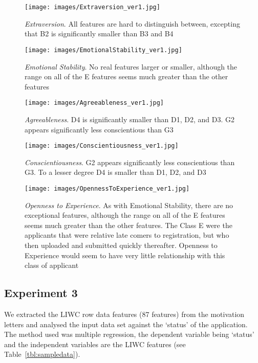 \documentclass[letterpaper]{article}
\begin{document}
\begin{figure*}[!hp]
\centering
\texttt{[image: images/Extraversion\_ver1.jpg]}
\caption{{\emph{Extraversion}}. All features are hard to distinguish between, excepting that B2 is
significantly smaller than B3 and B4}
\label{fig:extraversion}
\end{figure*}

\begin{figure*}[!hp]
\centering
\texttt{[image: images/EmotionalStability\_ver1.jpg]}
\caption{{\emph{Emotional Stability}}. No real features larger or smaller, although the range on all of the E
features seems much greater than the other features}
\label{fig:emotstab}
\end{figure*}

\begin{figure*}[!hp]
\centering
\texttt{[image: images/Agreeableness\_ver1.jpg]}
\caption{{\emph{Agreeableness}}. D4 is significantly smaller than D1, D2, and D3. G2 appears
significantly less conscientious than G3}
\label{fig:agreeableness}
\end{figure*}

\begin{figure*}[!hp]
\centering
\texttt{[image: images/Conscientiousness\_ver1.jpg]}
\caption{{\emph{Conscientiousness}}. G2 appears significantly less conscientious than G3. To a lesser
degree D4 is smaller than D1, D2, and D3}
\label{fig:conscientiousness}
\end{figure*}

\begin{figure*}[!hp]
\centering
\texttt{[image: images/OpennessToExperience\_ver1.jpg]}
\caption{{\emph{Openness to Experience}}. As with Emotional Stability, there are no exceptional features,
although the range on all of the E features seems much greater than
the other features. The Class E were the applicants that were relative
late comers to registration, but who then uploaded and submitted
quickly thereafter. Openness to Experience would seem to have very
little relationship with this class of applicant}
\label{fig:openexp}
\end{figure*}

\subsection{Experiment 3}

We extracted the LIWC row data features (87 features) from the
motivation letters and analysed the input data set against the
`status' of the application. The method used was multiple regression,
the dependent variable being `status' and the independent variables
are the LIWC features (see Table~\ref{tbl:sampledata}).
\end{document}
